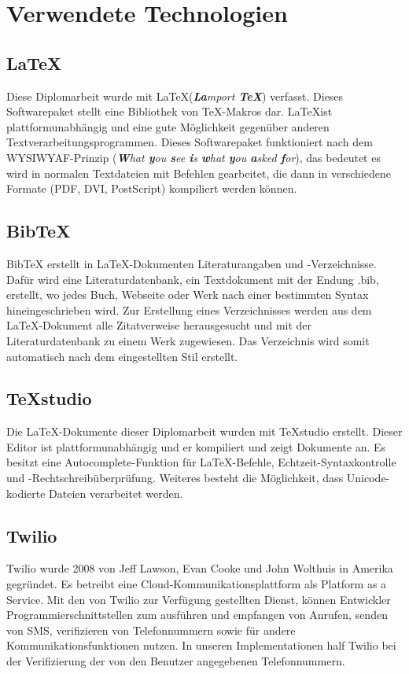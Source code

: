 \chapter{Verwendete Technologien} \label{technologien}

\section{\LaTeX}
Diese Diplomarbeit wurde mit \LaTeX \space (\textit{{\bf{\textit{La}}}mport {\bf{\textit{\TeX}}}}) verfasst. Dieses Softwarepaket stellt eine Bibliothek von \TeX-Makros dar. \LaTeX \space ist plattformunabhängig und eine gute Möglichkeit gegenüber anderen Textverarbeitungsprogrammen. Dieses Softwarepaket funktioniert nach dem WYSIWYAF-Prinzip (\textit{{\bf{W}}hat {\bf{y}}ou {\bf{s}}ee {\bf{i}}s {\bf{w}}hat {\bf{y}}ou {\bf{a}}sked {\bf{f}}or}), das bedeutet es wird in normalen Textdateien mit Befehlen gearbeitet, die dann in verschiedene Formate (PDF, DVI, PostScript) kompiliert werden können. \autocite{wikiLatex}

\section{BibTeX}
BibTeX erstellt in \LaTeX-Dokumenten Literaturangaben und -Verzeichnisse. Dafür wird eine Literaturdatenbank, ein Textdokument mit der Endung .bib, erstellt, wo jedes Buch, Webseite oder Werk nach einer bestimmten Syntax hineingeschrieben wird. Zur Erstellung eines Verzeichnisses werden aus dem \LaTeX-Dokument alle Zitatverweise herausgesucht und mit der Literaturdatenbank zu einem Werk zugewiesen. Das Verzeichnis wird somit automatisch nach dem eingestellten Stil erstellt. \autocite{wikiBibtex}

\section{TeXstudio}
Die \LaTeX-Dokumente dieser Diplomarbeit wurden mit TeXstudio erstellt. Dieser Editor ist plattformunabhängig und er kompiliert und zeigt Dokumente an. Es besitzt eine Autocomplete-Funktion für \LaTeX-Befehle, Echtzeit-Syntaxkontrolle und -Rechtschreibüberprüfung. Weiteres besteht die Möglichkeit, dass Unicode-kodierte Dateien verarbeitet werden. \autocite{wikiTexstudio}


\section{Twilio} \label{sec:twilio}
Twilio wurde 2008 von Jeff Lawson, Evan Cooke und John Wolthuis in Amerika gegründet. Es betreibt eine Cloud-Kommunikationsplattform als Platform as a Service. Mit den von Twilio zur Verfügung gestellten Dienst, können Entwickler Programmierschnittstellen zum ausführen und empfangen von Anrufen, senden von SMS, verifizieren von Telefonnummern sowie für andere Kommunikationsfunktionen nutzen. In unseren Implementationen half Twilio bei der Verifizierung der von den Benutzer angegebenen Telefonnummern. \cite{twilioWebsite}

